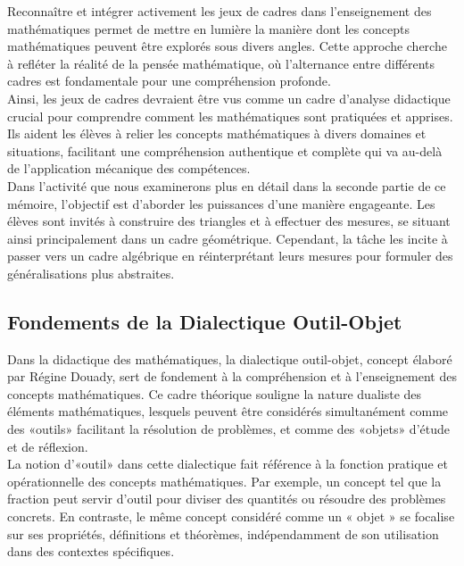 Reconnaître et intégrer activement les jeux de cadres dans l'enseignement des mathématiques permet de mettre en lumière la manière dont les concepts mathématiques peuvent être explorés sous divers angles.
Cette approche cherche à refléter la réalité de la pensée mathématique,
où l'alternance entre différents cadres est fondamentale pour une compréhension profonde.\\

Ainsi,
les jeux de cadres devraient être vus comme un cadre d'analyse didactique crucial pour comprendre comment les mathématiques sont pratiquées et apprises.
Ils aident les élèves à relier les concepts mathématiques à divers domaines et situations,
facilitant une compréhension authentique et complète qui va au-delà de l'application mécanique des compétences.\\

Dans l'activité que nous examinerons plus en détail dans la seconde partie de ce mémoire,
l'objectif est d'aborder les puissances d'une manière engageante.
Les élèves sont invités à construire des triangles et à effectuer des mesures,
se situant ainsi principalement dans un cadre géométrique.
Cependant,
la tâche les incite à passer vers un cadre algébrique en réinterprétant leurs mesures pour formuler des généralisations plus abstraites.

\subsection{Fondements de la Dialectique Outil-Objet}

Dans la didactique des mathématiques,
la dialectique outil-objet,
concept élaboré par Régine Douady,
sert de fondement à la compréhension et à l'enseignement des concepts mathématiques.
Ce cadre théorique souligne la nature dualiste des éléments mathématiques,
lesquels peuvent être considérés simultanément comme des «outils» facilitant la résolution de problèmes,
et comme des «objets» d'étude et de réflexion.\\

La notion d'«outil» dans cette dialectique fait référence à la fonction pratique et opérationnelle des concepts mathématiques.
Par exemple,
un concept tel que la fraction peut servir d'outil pour diviser des quantités ou résoudre des problèmes concrets.
En contraste,
le même concept considéré comme un « objet » se focalise sur ses propriétés,
définitions et théorèmes,
indépendamment de son utilisation dans des contextes spécifiques.\\

